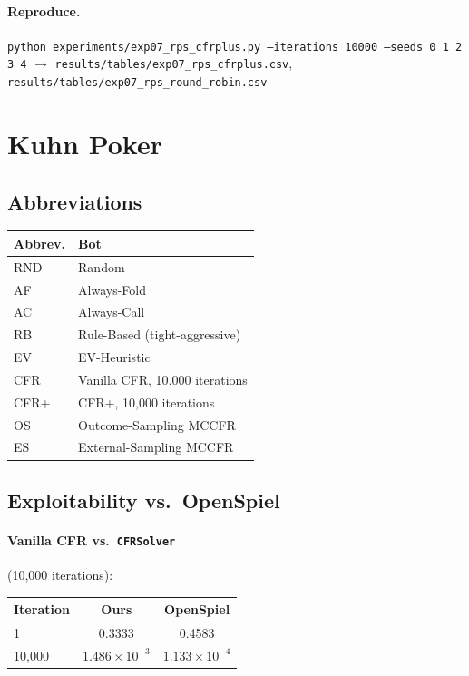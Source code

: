 \documentclass[11pt]{article}
\newcommand{\code}[1]{\texttt{#1}}
\begin{document}
\paragraph{Reproduce.} \code{python experiments/exp07\_rps\_cfrplus.py --iterations
10000 --seeds 0 1 2 3 4} $\rightarrow$ \code{results/tables/exp07\_rps\_cfrplus.csv},
\code{results/tables/exp07\_rps\_round\_robin.csv}

\section{Kuhn Poker}

\subsection*{Abbreviations}
\begin{center}
\begin{tabular}{ll}
\toprule
Abbrev. & Bot \\
\midrule
RND & Random \\
AF & Always-Fold \\
AC & Always-Call \\
RB & Rule-Based (tight-aggressive) \\
EV & EV-Heuristic \\
CFR & Vanilla CFR, 10{,}000 iterations \\
CFR+ & CFR+, 10{,}000 iterations \\
OS & Outcome-Sampling MCCFR \\
ES & External-Sampling MCCFR \\
\bottomrule
\end{tabular}
\end{center}

\subsection*{Exploitability vs.\ OpenSpiel}

\paragraph{Vanilla CFR vs.\ \code{CFRSolver}} (10{,}000 iterations):
\begin{center}
\begin{tabular}{lcc}
\toprule
Iteration & Ours & OpenSpiel \\
\midrule
1 & 0.3333 & 0.4583 \\
10{,}000 & $1.486\times10^{-3}$ & $1.133\times10^{-4}$ \\
\bottomrule
\end{tabular}
\end{center}
\end{document}
